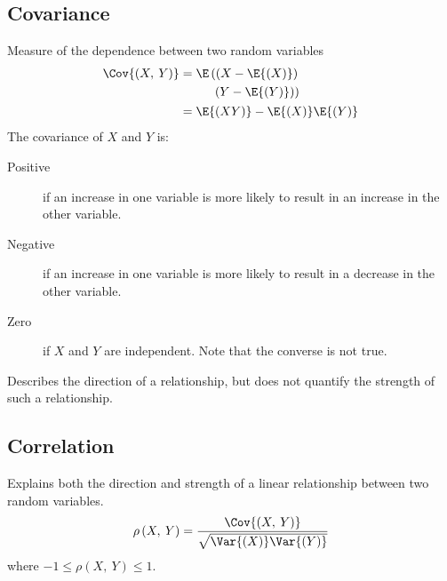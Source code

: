 \documentclass{article}
\begin{document}
\begin{multicols}{3}
    \subsection{Covariance}
    Measure of the dependence between two random variables
    \begin{align*}
        \Cov{\left( X,\: Y \right)} & = \begin{aligned}[t]
                                            \E\left( \left( X - \E{\left( X \right)} \right) \right. & \\
                                            \left. \left( Y - \E{\left( Y \right)} \right) \right)   &
                                        \end{aligned}                        \\
                                    & = \E{\left( XY \right)} - \E{\left( X \right)} \E{\left( Y \right)}
    \end{align*}
    The covariance of \(X\) and \(Y\) is:
    \begin{description}
        \item[Positive] if an increase in one variable is more likely to result in an increase in
            the other variable.
        \item[Negative] if an increase in one variable is more likely to result in a decrease in
            the other variable.
        \item[Zero] if \(X\) and \(Y\) are independent. Note that the converse is not true.
    \end{description}
    Describes the direction of a relationship, but does not quantify the strength of such a relationship.
    \subsection{Correlation}
    Explains both the direction and strength of a linear relationship between two random variables.
    \begin{equation*}
        \rho\left( X,\: Y \right) = \frac{\Cov{\left( X,\: Y \right)}}{\sqrt{\Var{\left( X \right)} \Var{\left( Y \right)}}}
    \end{equation*}
    where \(-1 \leq \rho\left( X,\: Y \right) \leq 1\).


\end{multicols}
\end{document}
